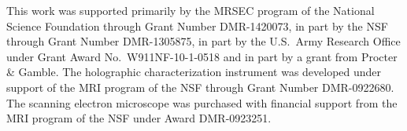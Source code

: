 This work was supported primarily by the MRSEC program of the National
Science Foundation through Grant Number DMR-1420073, in part by the NSF
through Grant Number DMR-1305875, in part by
the U.S.\ Army Research Office under Grant Award No.\ W911NF-10-1-0518
and in part by a grant from Procter \& Gamble.
The holographic characterization instrument
was developed under support of the MRI program of the NSF through Grant Number
DMR-0922680.  The scanning electron microscope was purchased with financial
support from the MRI program of the NSF under Award DMR-0923251.

%
%
